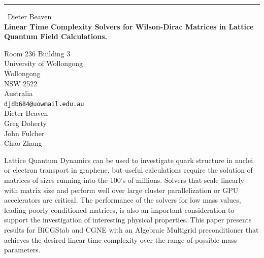 \documentclass{report}
\begin{document}
\begin{center}
\rule{6in}{1pt} \
{\large Dieter Beaven \\
{\bf Linear Time Complexity Solvers for Wilson-Dirac Matrices in Lattice Quantum Field Calculations.}}

Room 236 Building 3 \\ University of Wollongong \\ Wollongong \\ NSW 2522 \\ Australia
\\
{\tt djdb684@uowmail.edu.au}\\
Dieter Beaven\\
Greg Doherty\\
John Fulcher\\
Chao Zhang\end{center}

Lattice Quantum Dynamics can be used to investigate quark structure in
nuclei or electron transport in graphene, but useful calculations require
the solution of matrices of sizes running into the 100's of millions.
Solvers that scale linearly with matrix size and perform well over large
cluster parallelization or GPU accelerators are critical. The performance
of the solvers for low mass values, leading poorly conditioned matrices,
is also an important consideration to support the investigation of
interesting physical properties. This paper presents results for BiCGStab
and CGNE with an Algebraic Multigrid preconditioner that achieves the
desired linear time complexity over the range of possible mass
parameters.
\end{document}
